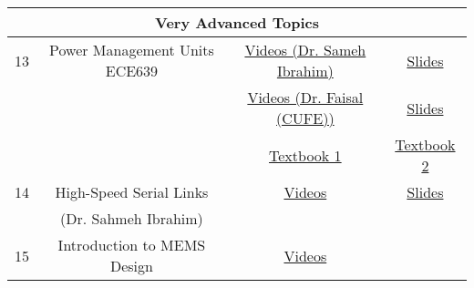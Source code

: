 \documentclass{article}
\begin{document}
\begin{table}[H]
{\begin{tabular}{|c|c|c|c|}
            \multicolumn{4}{|c|}{Very Advanced Topics}\\ \hline
            13& Power Management Units ECE639& \href{https://www.youtube.com/playlist?list=PLc3vj1kda1mMIpoirTqGAkpFkiaDr-1B7}{Videos (Dr. Sameh Ibrahim)}& \href{https://drive.google.com/drive/folders/1xKt86mo2VVvd7VAhiKFjCTdCL396Bxuw?usp=sharing}{Slides}\\
            & & \href{https://drive.google.com/file/d/1tky5eRk_zzhzEzDRzOxxgUTvPElRgQOP/view?usp=sharing}{Videos (Dr. Faisal (CUFE))}& \href{https://drive.google.com/drive/folders/1keUwHvL4U729MuYV8MaZ-OL-hn3qs4cd?usp=sharing}{Slides}\\ 
            & & \href{https://drive.google.com/file/d/1t1gTkfL-uktHnqvjw3asmg0XM5fTUETr/view?usp=sharing}{Textbook 1}& \href{https://drive.google.com/file/d/1t1gTkfL-uktHnqvjw3asmg0XM5fTUETr/view?usp=sharing}{Textbook 2} \\ \hline
            14& High-Speed Serial Links& \href{https://www.youtube.com/playlist?list=PLAlobGNba63_3NjxocT7eUZyn3Fc76wTU}{Videos}& \href{https://drive.google.com/drive/folders/1unc16zYO_6FmJRUHK_F1QmMmPNBGnD-D}{Slides}\\
            & (Dr. Sahmeh Ibrahim)& & \\ \hline
            15& Introduction to MEMS Design& \href{https://www.youtube.com/playlist?list=PLL1cLr3cXVKnr4pp957DlkB_Ubl4UHiAS}{Videos}& \\ \hline
        \end{tabular}
    }
\end{table}

\newpage
\end{document}
